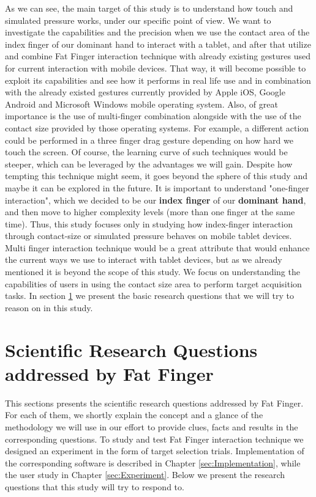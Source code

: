 As we can see, the main target of this study is to understand how touch and simulated pressure works, under our specific point of view. We want to investigate the capabilities and the precision when we use the contact area of the index finger of our dominant hand to interact with a tablet, and after that utilize and combine Fat Finger interaction technique with already existing gestures used for current interaction with mobile devices. 
That way, it will become possible to exploit its capabilities and see how it performs in real life use and in combination with the already existed gestures currently provided by Apple iOS, Google Android and Microsoft Windows mobile operating system.
Also, of great importance is the use of multi-finger combination alongside with the use of the contact size provided by those operating systems. For example, a different action could be performed in a three finger drag gesture depending on how hard we touch the screen. 
Of course, the learning curve of such techniques would be steeper, which can be leveraged by the advantages we will gain. Despite how tempting this technique might seem, it goes beyond the sphere of this study and maybe it can be explored in the future.
It is important to understand "one-finger interaction", which we decided to be our \textbf{index finger} of our \textbf{dominant hand}, and then move to higher complexity levels (more than one finger at the same time).
Thus, this study focuses only in studying how index-finger interaction through contact-size or simulated pressure behaves on mobile tablet devices. Multi finger interaction technique would be a great attribute that would enhance the current ways we use to interact with tablet devices, but as we already mentioned it is beyond the scope of this study.
We focus on understanding the capabilities of users in using the contact size area to perform target acquisition tasks. In section \ref{sec:FFResearchQuestions} we present the basic research questions that we will try to reason on in this study.



\section{Scientific Research Questions addressed by Fat Finger}
\label{sec:FFResearchQuestions}

This sections presents the scientific research questions addressed by Fat Finger. For each of them, we shortly explain the concept and a glance of the methodology we will use in our effort to provide clues, facts and results in the corresponding questions.
To study and test Fat Finger interaction technique we designed an experiment in the form of target selection trials. Implementation of the corresponding software is described in Chapter \ref{sec:Implementation}, while the user study in Chapter \ref{sec:Experiment}. Below we present the research questions that this study will try to respond to.

